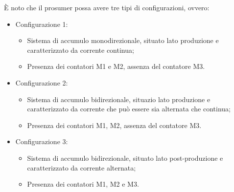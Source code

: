 È noto che il prosumer possa avere tre tipi di configurazioni, ovvero:
\begin{itemize}
    \item Configurazione 1:
          \begin{itemize}
              \item Sistema di accumulo monodirezionale, situato lato produzione e caratterizzato da corrente continua;
              \item Presenza dei contatori M1 e M2, assenza del contatore M3.
          \end{itemize}
    \item Configurazione 2:
          \begin{itemize}
              \item Sistema di accumulo bidirezionale, situazio lato produzione e caratterizzato da corrente che può essere sia alternata che continua;
              \item Presenza dei contatori M1, M2, assenza del contatore M3.
          \end{itemize}
    \item Configurazione 3:
          \begin{itemize}
              \item Sistema di accumulo bidirezionale, situato lato post-produzione e caratterizzato da corrente alternata;
              \item Presenza dei contatori M1, M2 e M3.
          \end{itemize}
\end{itemize}

